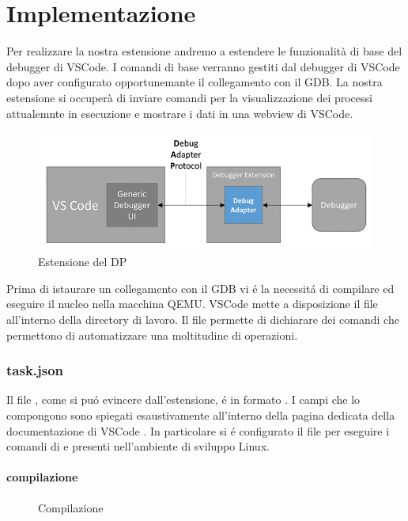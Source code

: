 \chapter{Implementazione}
Per realizzare la nostra estensione andremo a estendere le funzionalità di base del debugger di VSCode. I comandi di base verranno gestiti dal debugger di VSCode dopo aver configurato opportunemante il collegamento con il GDB. La nostra estensione 
si occuperà di inviare comandi per la visualizzazione dei processi attualemnte in esecuzione e mostrare i dati in una webview di VSCode.

\begin{figure}[H]
    \centering
    \includegraphics[width=0.7\columnwidth]{images/debug-arch2.png}
    \caption{Estensione del DP}
    \label{fig:dap dp and extension}
\end{figure}

Prima di istaurare un collegamento con il GDB vi é la necessitá di compilare ed eseguire il nucleo nella macchina QEMU. VSCode mette a disposizione il file  all'interno della directory di lavoro. Il file permette di dichiarare dei comandi che permettono di automatizzare una moltitudine di operazioni.
\subsection*{task.json}
Il file , come si puó evincere dall'estensione, é in formato . I campi che lo compongono sono spiegati esaustivamente all'interno della pagina dedicata della documentazione di VSCode \cite{VSCodeTasks}. In particolare si é configurato il file per eseguire i comandi di  e  presenti nell'ambiente di sviluppo Linux.  

\subsubsection*{compilazione}   

\begin{figure}[H]
    
    \caption{Compilazione}
\end{figure}

